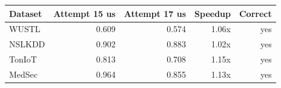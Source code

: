 \begin{tabular}{lrrrr}
\toprule
Dataset & Attempt 15 us & Attempt 17 us & Speedup & Correct \\
\midrule
WUSTL & 0.609 & 0.574 & 1.06x & yes \\
NSLKDD & 0.902 & 0.883 & 1.02x & yes \\
TonIoT & 0.813 & 0.708 & 1.15x & yes \\
MedSec & 0.964 & 0.855 & 1.13x & yes \\
\bottomrule
\end{tabular}
